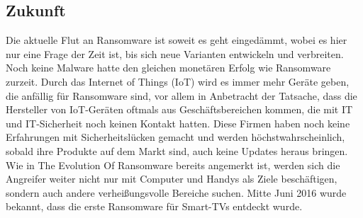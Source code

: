 \subsection{Zukunft}

Die aktuelle Flut an Ransomware ist soweit es geht eingedämmt, wobei es hier nur eine Frage der Zeit ist, bis sich neue Varianten entwickeln und verbreiten. Noch keine Malware hatte den gleichen monetären Erfolg wie Ransomware zurzeit. Durch das Internet of Things (IoT) wird es immer mehr Geräte geben, die anfällig für Ransomware sind, vor allem in Anbetracht der Tatsache, dass die Hersteller von IoT-Geräten oftmals aus Geschäftsbereichen kommen, die mit IT und IT-Sicherheit noch keinen Kontakt hatten. Diese Firmen haben noch keine Erfahrungen mit Sicherheitslücken gemacht und werden höchstwahrscheinlich, sobald ihre Produkte auf dem Markt sind, auch keine Updates heraus bringen.\\
Wie in \glqq The Evolution Of Ransomware\grqq{} bereits angemerkt ist, werden sich die Angreifer weiter nicht nur mit Computer und Handys als Ziele beschäftigen, sondern auch andere verheißungsvolle Bereiche suchen. Mitte Juni 2016 wurde bekannt, dass die erste Ransomware für Smart-TVs entdeckt wurde\cite{smarttv}.